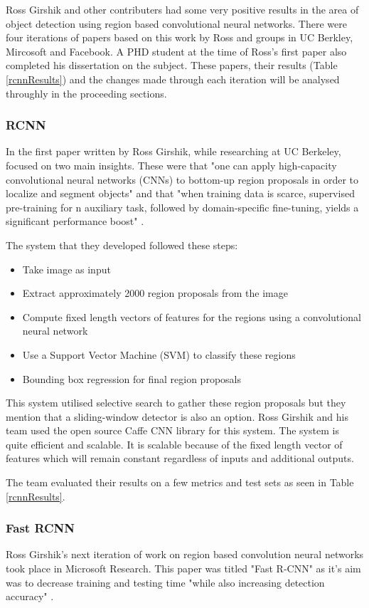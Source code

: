 Ross Girshik and other contributers had some very positive results in the area
of object detection using region based convolutional neural networks. There were
four iterations of papers based on this work by Ross and groups in UC Berkley,
Mircosoft and Facebook. A PHD student at the time of Ross's first paper also
completed his dissertation on the subject. These papers, their
results (Table \ref{rcnnResults}) and the changes made through each iteration will be analysed throughly in the proceeding sections.

\subsubsection*{RCNN}
In the first paper written by Ross Girshik, while researching at UC Berkeley,
focused on two main insights. These were that "one can apply high-capacity convolutional neural networks (CNNs) to bottom-up region proposals in order to localize and segment objects" and that
"when training data is scarce, supervised pre-training for n auxiliary task,
followed by domain-specific fine-tuning, yields a significant performance boost"
\parencite{rcnn}.

The system that they developed followed these steps:
\begin{itemize}
    \item{Take image as input}
    \item{Extract approximately 2000 region proposals from the image}
    \item{Compute fixed length vectors of features for the regions using a convolutional
        neural network}
    \item{Use a Support Vector Machine (SVM) to classify these regions}
    \item{Bounding box regression for final region proposals}
\end{itemize}

This system utilised selective search to gather these region proposals but they
mention that a sliding-window detector is also an option. Ross Girshik and his
team used the open source Caffe CNN library for this system. The system is quite
efficient and scalable. It is scalable because of the fixed length vector of
features which will remain constant regardless of inputs and additional outputs.

The team evaluated their results on a few metrics and test sets as seen in Table
\ref{rcnnResults}.

\subsubsection*{Fast RCNN}
Ross Girshik's next iteration of work on region based convolution neural
networks took place in Microsoft Research. This paper was titled "Fast R-CNN" as
it's aim was to decrease training and testing time "while also increasing
detection accuracy" \parencite{fastRcnn}.

